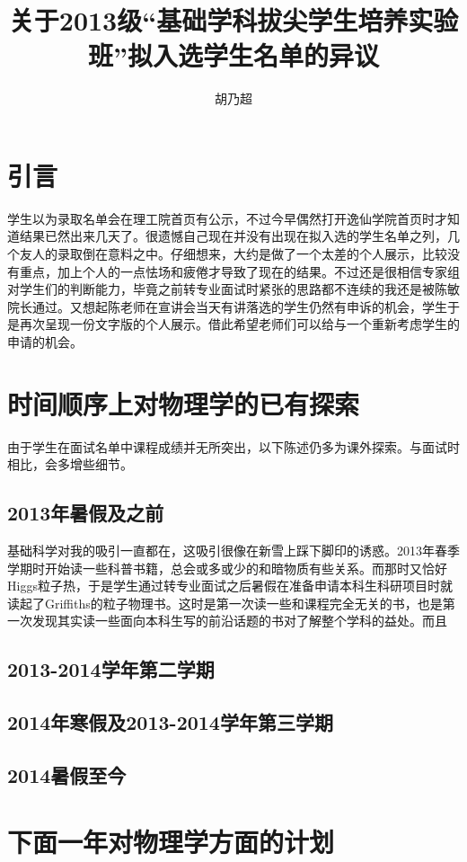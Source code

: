 \documentclass[10pt,a4paper]{article}
\title{关于2013级“基础学科拔尖学生培养实验班”拟入选学生名单的异议}
\author{胡乃超}
\date{}
\begin{document}
\begin{spacing}{1.6}
\maketitle
\section{引言}
学生以为录取名单会在理工院首页有公示，不过今早偶然打开逸仙学院首页时才知道结果已然出来几天了。很遗憾自己现在并没有出现在拟入选的学生名单之列，几个友人的录取倒在意料之中。仔细想来，大约是做了一个太差的个人展示，比较没有重点，加上个人的一点怯场和疲倦才导致了现在的结果。不过还是很相信专家组对学生们的判断能力，毕竟之前转专业面试时紧张的思路都不连续的我还是被陈敏院长通过。又想起陈老师在宣讲会当天有讲落选的学生仍然有申诉的机会，学生于是再次呈现一份文字版的个人展示。借此希望老师们可以给与一个重新考虑学生的申请的机会。\par

\section{时间顺序上对物理学的已有探索}
由于学生在面试名单中课程成绩并无所突出，以下陈述仍多为课外探索。与面试时相比，会多增些细节。
\subsection{2013年暑假及之前}
基础科学对我的吸引一直都在，这吸引很像在新雪上踩下脚印的诱惑。2013年春季学期时开始读一些科普书籍，总会或多或少的和暗物质有些关系。而那时又恰好Higgs粒子热，于是学生通过转专业面试之后暑假在准备申请本科生科研项目时就读起了Griffiths的粒子物理书\cite{grif-ep}。这时是第一次读一些和课程完全无关的书，也是第一次发现其实读一些面向本科生写的前沿话题的书对了解整个学科的益处。而且
\subsection{2013-2014学年第二学期}
\subsection{2014年寒假及2013-2014学年第三学期}
\subsection{2014暑假至今}

\section{下面一年对物理学方面的计划}

\end{spacing}
\end{document}
